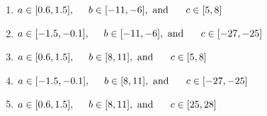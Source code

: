 \documentclass[14pt]{extbook}
\begin{document}
\begin{enumerate}
{\begin{center}
\end{center}
\begin{enumerate}[label=\Alph*.]
\item \( a \in [0.6, 1.5], \hspace*{5mm} b \in [-11, -6], \text{ and } \hspace*{5mm} c \in [5, 8] \)
\item \( a \in [-1.5, -0.1], \hspace*{5mm} b \in [-11, -6], \text{ and } \hspace*{5mm} c \in [-27, -25] \)
\item \( a \in [0.6, 1.5], \hspace*{5mm} b \in [8, 11], \text{ and } \hspace*{5mm} c \in [5, 8] \)
\item \( a \in [-1.5, -0.1], \hspace*{5mm} b \in [8, 11], \text{ and } \hspace*{5mm} c \in [-27, -25] \)
\item \( a \in [0.6, 1.5], \hspace*{5mm} b \in [8, 11], \text{ and } \hspace*{5mm} c \in [25, 28] \)


\end{enumerate}}
\end{enumerate}
\end{document}
